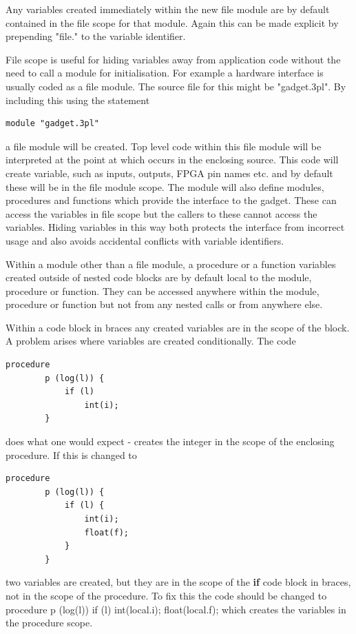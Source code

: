         Any variables created immediately within the new file module are by default
        contained in the file scope for that module. Again this can be made explicit
        by prepending "file." to the variable identifier.

        File scope is useful for hiding variables away from application code without
        the need to call a module for initialisation. For example a hardware
        interface is usually coded as a file module. The source file for this might be
        "gadget.3pl". By including this using the statement
        \begin{lstlisting}[language=threepl]
            module "gadget.3pl"
        \end{lstlisting}
        a file module will be created. Top level code within this file module will
        be interpreted at the point at which occurs in the enclosing source. This
        code will create variable, such as inputs, outputs, FPGA pin names etc. and 
        by default these will be in the file module scope. The module will also
        define modules, procedures and functions which provide the interface to the
        gadget. These can access the variables in file scope but the callers to
        these cannot access the variables. Hiding variables in this way both
        protects the interface from incorrect usage and also avoids accidental
        conflicts with variable identifiers.

        Within a module other than a file module, a procedure or a function variables
        created outside of nested code blocks are by default local to the module,
        procedure or function. They can be accessed anywhere within the module,
        procedure or function but not from any nested calls or from anywhere else.

        Within a code block in braces any created variables are in the scope
        of the block. A problem arises where variables are created conditionally.
        The code
        \begin{lstlisting}[language=threepl]
        procedure
        p (log(l)) {
            if (l)
                int(i);
        }
        \end{lstlisting}
        does what one would expect - creates the integer  in the scope
        of the enclosing procedure. If this is changed to
        \begin{lstlisting}[language=threepl]
        procedure
        p (log(l)) {
            if (l) {
                int(i);
                float(f);
            }
        }
        \end{lstlisting}
        two variables are created, but they are in the scope of the {\bf if} code
        block in braces, not in the scope of the procedure. To fix this the code
        should be changed to
        procedure
        p (log(l)) {
            if (l) {
                int(local.i);
                float(local.f);
            }
        }
        which creates the variables in the procedure scope.


